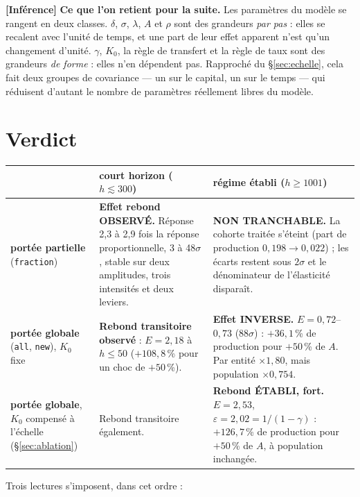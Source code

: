 \documentclass[11pt,a4paper]{article}
\newcommand{\code}[1]{\texttt{#1}}
\newcommand{\inference}{\textbf{[Inférence]}}
\begin{document}
\inference{} \textbf{Ce que l'on retient pour la suite.} Les paramètres du
modèle se rangent en deux classes. $\delta$, $\sigma$, $\lambda$, $A$ et
$\rho$ sont des grandeurs \emph{par pas} : elles se recalent avec l'unité de
temps, et une part de leur effet apparent n'est qu'un changement d'unité.
$\gamma$, $K_0$, la règle de transfert et la règle de taux sont des grandeurs
\emph{de forme} : elles n'en dépendent pas. Rapproché du
§\ref{sec:echelle}, cela fait deux groupes de covariance --- un sur le
capital, un sur le temps --- qui réduisent d'autant le nombre de paramètres
réellement libres du modèle.

\section{Verdict}

\begin{center}
\begin{tabularx}{\textwidth}{@{}lXX@{}}
\toprule
& \textbf{court horizon} ($h \lesssim 300$) & \textbf{régime établi} ($h \ge 1001$) \\
\midrule
\textbf{portée partielle} (\code{fraction}) &
\textbf{Effet rebond OBSERVÉ.} Réponse 2,3 à 2,9 fois la réponse
proportionnelle, 3 à 48$\sigma$, stable sur deux amplitudes, trois
intensités et deux leviers. &
\textbf{NON TRANCHABLE.} La cohorte traitée s'éteint (part de production
$0{,}198 \to 0{,}022$) ; les écarts restent sous $2\sigma$ et le
dénominateur de l'élasticité disparaît. \\
\addlinespace
\textbf{portée globale} (\code{all}, \code{new}), $K_0$ fixe &
\textbf{Rebond transitoire observé} : $E = 2{,}18$ à $h\le50$
($+108{,}8$\,\% pour un choc de $+50$\,\%). &
\textbf{Effet INVERSE.} $E = 0{,}72$--$0{,}73$ ($88\sigma$) : $+36{,}1$\,\%
de production pour $+50$\,\% de $A$. Par entité $\times1{,}80$, mais
population $\times0{,}754$. \\
\addlinespace
\textbf{portée globale}, $K_0$ compensé à l'échelle (§\ref{sec:ablation}) &
Rebond transitoire également. &
\textbf{Rebond ÉTABLI, fort.} $E = 2{,}53$, $\varepsilon = 2{,}02 =
1/(1-\gamma)$ : $+126{,}7$\,\% de production pour $+50$\,\% de $A$,
à population inchangée. \\
\bottomrule
\end{tabularx}
\end{center}

\noindent Trois lectures s'imposent, dans cet ordre :
\end{document}
